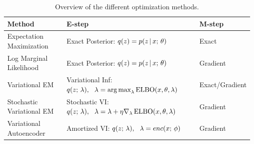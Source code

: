 \documentclass{article}
\begin{document}

\begin{table}[]
    \centering
    \begin{tabular}{l l l }
    \toprule
        Method  & E-step & M-step \\
    \midrule
         Expectation Maximization & Exact Posterior: $q(z) = p(z \,|\, x ; \, \theta)$ & Exact \\
         Log Marginal Likelihood & Exact Posterior: $q(z) = p(z \,|\, x ; \, \theta)$ & Gradient \\
         Variational EM & Variational Inf: $q(z \param \lambda), \,\,\,\, \lambda = \argmax_{\lambda} \ELBO(x, \theta, \lambda)$ & Exact/Gradient \\
         Stochastic Variational EM & Stochastic VI: $q(z ; \, \lambda), \,\,\,\, \lambda = \lambda + \eta \nabla_\lambda \operatorname*{ELBO}(x, \theta, \lambda)$ & Gradient\\
         Variational Autoencoder & Amortized VI: $q(z ; \, \lambda), \,\,\,\, \lambda = enc(x ; \, \phi)$ & Gradient \\
         \bottomrule
    \end{tabular}
    \caption{Overview of the different optimization methods.}
    \label{tab:summary}
\end{table}


\end{document}
